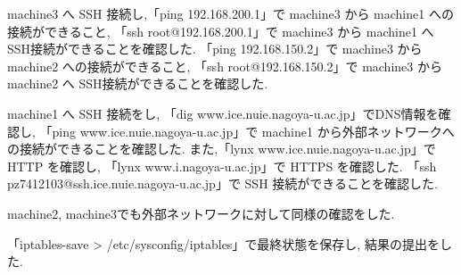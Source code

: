 \documentclass{ltjsarticle} %
\begin{document}
machine3 へ SSH 接続し,「ping 192.168.200.1」で machine3 から machine1 への接続ができること, 
「ssh root@192.168.200.1」で machine3 から machine1 へ SSH接続ができることを確認した. 
「ping 192.168.150.2」で machine3 から machine2 への接続ができること, 
「ssh root@192.168.150.2」で machine3 から machine2 へ SSH接続ができることを確認した. 

machine1 へ SSH 接続をし, 「dig www.ice.nuie.nagoya-u.ac.jp」でDNS情報を確認し, 
「ping www.ice.nuie.nagoya-u.ac.jp」で machine1 から外部ネットワークへの接続ができることを確認した.  
また,「lynx www.ice.nuie.nagoya-u.ac.jp」で HTTP を確認し, 「lynx www.i.nagoya-u.ac.jp」で HTTPS を確認した. 
「ssh pz7412103@ssh.ice.nuie.nagoya-u.ac.jp」で SSH 接続ができることを確認した. 

machine2, machine3でも外部ネットワークに対して同様の確認をした. 

「iptables-save > /etc/sysconfig/iptables」で最終状態を保存し, 結果の提出をした. 
\end{document}
